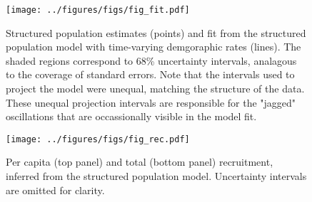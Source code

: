 \documentclass[11pt]{article}
\begin{document}














\clearpage



\clearpage
\begin{figure}
\centering
\texttt{[image: ../figures/figs/fig\_fit.pdf]}
\caption{\label{fig:fit}
Structured population estimates (points) and 
fit from the structured population model 
with time-varying demgoraphic rates (lines). 
The shaded regions correspond to 68\% uncertainty intervals,
analagous to the coverage of standard errors.
Note that the intervals used to project the model were unequal,
matching the structure of the data.
These unequal projection intervals are responsible for the "jagged" oscillations
that are occassionally visible in the model fit.
}
\end{figure}
\clearpage

\clearpage
\begin{figure}
\centering
\texttt{[image: ../figures/figs/fig\_rec.pdf]}
\caption{\label{fig:rec}
Per capita (top panel) and total (bottom panel) recruitment, 
inferred from the structured population model.
Uncertainty intervals are omitted for clarity.
}
\end{figure}
\clearpage
\end{document}
